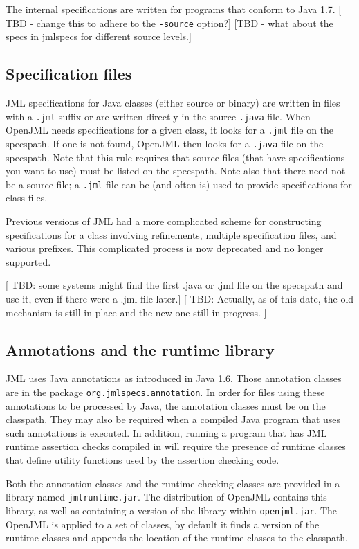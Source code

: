 \documentclass{report}%
\begin{document}
The internal specifications are written for programs that conform to Java 1.7.  [ TBD - change this to adhere to the {\tt -source} option?] 
[TBD - what about the specs in jmlspecs for different source levels.]

\subsection{Specification files}

JML specifications for Java classes (either source or binary) are written in files with a {\tt .jml} suffix or are written directly in the source {\tt .java} file.
When OpenJML needs specifications for a given class, it looks for a {\tt .jml} file on the specspath. If one is not found, OpenJML then looks for a {\tt .java}
file on the specspath. Note that this rule requires that source files (that have specifications you want to use) must be listed on the specspath. Note also that there 
need not be a source file; a {\tt .jml} file can be (and often is) used to provide specifications for class files.

Previous versions of JML had a more complicated scheme for constructing specifications for a class involving refinements, multiple specification files, and various prefixes. This complicated process is now deprecated and no longer supported.

[ TBD: some systems might find the first .java or .jml file on the specspath and use it, even if there were a .jml file later.]
[ TBD: Actually, as of this date, the old mechanism is still in place and the new one still in progress. ]

\subsection{Annotations and the runtime library}

JML uses Java annotations as introduced in Java 1.6. Those annotation classes are in the package
{\tt org.jmlspecs.annotation}. In order for files using these annotations to be processed by Java,
the annotation classes must be on the classpath. They may also be required when a compiled Java program
that uses such annotations is executed. In addition, running a program that has JML runtime assertion
checks compiled in will require the presence of runtime classes that define utility functions used by the assertion checking code.

Both the annotation classes and the runtime checking classes are provided in a library named {\tt jmlruntime.jar}.  The distribution of OpenJML contains this library, as well as containing a
version of the library within {\tt openjml.jar}. The OpenJML is applied to a set of classes, by default it finds a version of the runtime classes and appends the location of the runtime classes
to the classpath.
\end{document}
